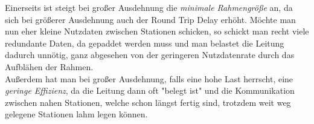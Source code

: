 \documentclass{../exercisesheet}
\begin{document}
\begin{exercise}{6}
\begin{subexercise}
	Einerseits ist steigt bei großer Ausdehnung die \textit{minimale Rahmengröße} an, da sich bei größerer Ausdehnung auch der Round Trip Delay erhöht. Möchte man nun
	eher kleine Nutzdaten zwischen Stationen schicken, so schickt man recht viele redundante Daten, da gepaddet werden muss und man belastet die Leitung dadurch unnötig, ganz
	abgesehen von der geringeren Nutzdatenrate durch das Aufblähen der Rahmen.\\
	Außerdem hat man bei großer Ausdehnung, falls eine hohe Last herrscht, eine \textit{geringe Effizienz}, da die Leitung dann oft "belegt ist" und die Kommunikation zwischen
	nahen Stationen, welche schon längst fertig sind, trotzdem weit weg gelegene Stationen lahm legen können.
	
\end{subexercise}
\end{exercise}
\end{document}
